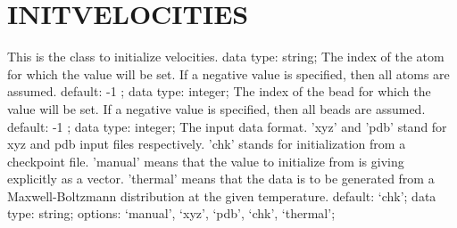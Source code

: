 \section{INITVELOCITIES}
\label{INITVELOCITIES}
\begin{ipifield}{}%
{This is the class to initialize velocities.}%
{data type: string; }%
{%
{The index of the atom for which the value will be set. If a negative value is specified, then all atoms are assumed.}%
{default:  -1 ; data type: integer; }%
%
{The index of the bead for which the value will be set. If a negative value is specified, then all beads are assumed.}%
{default:  -1 ; data type: integer; }%
%
{The input data format. 'xyz' and 'pdb' stand for xyz and pdb input files respectively. 'chk' stands for initialization from a checkpoint file. 'manual' means that the value to initialize from is giving explicitly as a vector. 'thermal' means that the data is to be generated from a Maxwell-Boltzmann distribution at the given temperature.}%
{default: `chk'; data type: string; options: `manual', `xyz', `pdb', `chk', `thermal'; }%
}
\end{ipifield}
